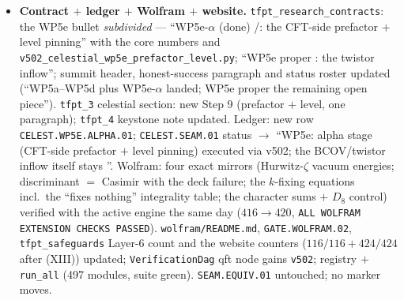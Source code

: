 \begin{itemize}[leftmargin=1.5em]
WP5b/WP5c). \mO\ the BCOV/Costello--Li twistor inflow itself (Costello's one-loop axion
$\lambda_g/(8\pi\sqrt3)$ on $\mathbb{PT}$, the Costello--Paquette--Sharma level-from-flux mechanism)
--- v502 anchors the \emph{CFT side} of WP5e only; the KILL branch (``inflow demands a level
$\neq1$'') is not triggered on the CFT side, its twistor side is untested.
\item \textbf{Contract $+$ ledger $+$ Wolfram $+$ website.} \texttt{tfpt\_research\_contracts}: the
WP5e bullet \emph{subdivided} --- ``WP5e-$\alpha$ (done) \mE/\mC: the CFT-side prefactor $+$ level
pinning'' with the core numbers and \texttt{v502\_celestial\_wp5e\_prefactor\_level.py}; ``WP5e
proper \mO: the twistor inflow''; summit header, honest-success paragraph and status roster updated
(``WP5a--WP5d plus WP5e-$\alpha$ landed; WP5e proper the remaining open piece'').
\texttt{tfpt\_3} celestial section: new Step 9 (prefactor $+$ level, one paragraph);
\texttt{tfpt\_4} keystone note updated. Ledger: new row \texttt{CELEST.WP5E.ALPHA.01};
\texttt{CELEST.SEAM.01} status $\to$ ``WP5e: alpha stage (CFT-side prefactor $+$ level pinning)
executed via v502; the BCOV/twistor inflow itself stays \mO''. Wolfram: four exact mirrors
(Hurwitz-$\zeta$ vacuum energies; discriminant $=$ Casimir with the deck failure; the $k$-fixing
equations incl.\ the ``fixes nothing'' integrality table; the character sums $+$ $D_8$ control)
verified with the active engine the same day ($416\to420$, \texttt{ALL WOLFRAM EXTENSION CHECKS
PASSED}). \texttt{wolfram/README.md}, \texttt{GATE.WOLFRAM.02}, \texttt{tfpt\_safeguards} Layer-6
count and the website counters ($116/116+424/424$ after (XIII)) updated; \texttt{VerificationDag}
qft node gains \texttt{v502}; registry $+$ \texttt{run\_all} (497 modules, suite green).
\texttt{SEAM.EQUIV.01} untouched; no marker moves.
\end{itemize}

